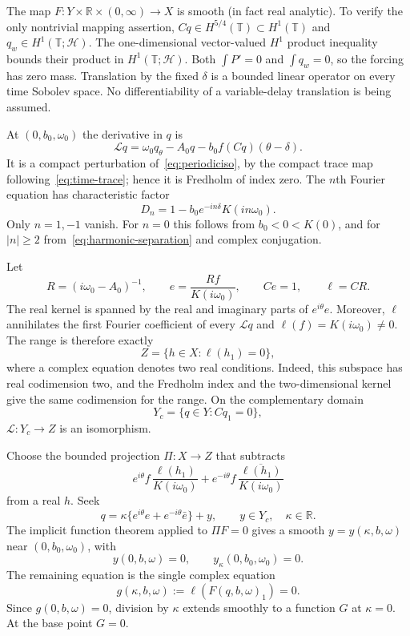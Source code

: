 \documentclass[11pt,a4paper]{article}
\numberwithin{equation}{section}
\theoremstyle{remark}\newtheorem{remark}[theorem]{Remark}
\newcommand{\R}{\mathbb R}\newcommand{\C}{\mathbb C}\newcommand{\T}{\mathbb T}
\newcommand{\HH}{\mathcal H}\newcommand{\DD}{\mathcal D}
\begin{document}
The map $F:Y\times\R\times(0,\infty)\to X$ is smooth (in fact real analytic). To verify the only nontrivial mapping assertion, $Cq\in H^{5/4}(\T)\subset H^1(\T)$ and $q_w\in H^1(\T;\HH)$. The one-dimensional vector-valued $H^1$ product inequality bounds their product in $H^1(\T;\HH)$. Both $\int P'=0$ and $\int q_w=0$, so the forcing has zero mass. Translation by the fixed $\delta$ is a bounded linear operator on every time Sobolev space. No differentiability of a variable-delay translation is being assumed.

At $(0,b_0,\omega_0)$ the derivative in $q$ is
\[
 \mathcal Lq=\omega_0q_\theta-A_0q
             -b_0f(Cq)(\theta-\delta).
\]
It is a compact perturbation of~\eqref{eq:periodiciso}, by the compact trace map following~\eqref{eq:time-trace}; hence it is Fredholm of index zero. The $n$th Fourier equation has characteristic factor
\begin{equation}\label{eq:charfactor}
 D_n=1-b_0e^{-in\delta}K(in\omega_0).
\end{equation}
Only $n=1,-1$ vanish. For $n=0$ this follows from $b_0<0<K(0)$, and for $|n|\geq2$ from~\eqref{eq:harmonic-separation} and complex conjugation.

Let
\[
 R=(i\omega_0-A_0)^{-1},\qquad
 e=\frac{Rf}{K(i\omega_0)},\qquad Ce=1,
 \qquad \ell=CR.
\]
The real kernel is spanned by the real and imaginary parts of $e^{i\theta}e$. Moreover, $\ell$ annihilates the first Fourier coefficient of every $\mathcal Lq$ and $\ell(f)=K(i\omega_0)\ne0$. The range is therefore exactly
\[
 Z=\{h\in X:\ell(h_1)=0\},
\]
where a complex equation denotes two real conditions. Indeed, this subspace has real codimension two, and the Fredholm index and the two-dimensional kernel give the same codimension for the range. On the complementary domain
\[
 Y_c=\{q\in Y:Cq_1=0\},
\]
$\mathcal L:Y_c\to Z$ is an isomorphism.

Choose the bounded projection $\Pi:X\to Z$ that subtracts
\[
 e^{i\theta}f\,\frac{\ell(h_1)}{K(i\omega_0)}
 +e^{-i\theta}f\,\overline{\frac{\ell(h_1)}{K(i\omega_0)}}
\]
from a real $h$. Seek
\begin{equation}\label{eq:branchansatz}
 q=\kappa\{e^{i\theta}e+e^{-i\theta}\bar e\}+y,
 \qquad y\in Y_c,\quad\kappa\in\R.
\end{equation}
The implicit function theorem applied to $\Pi F=0$ gives a smooth
$y=y(\kappa,b,\omega)$ near $(0,b_0,\omega_0)$, with
\[
 y(0,b,\omega)=0,\qquad y_\kappa(0,b_0,\omega_0)=0.
\]
The remaining equation is the single complex equation
\[
 g(\kappa,b,\omega):=\ell(F(q,b,\omega)_1)=0.
\]
Since $g(0,b,\omega)=0$, division by $\kappa$ extends smoothly to a function $G$ at $\kappa=0$. At the base point $G=0$.
\end{document}
